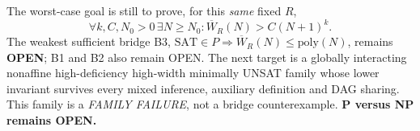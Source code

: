 \documentclass[11pt]{article}
\begin{document}
The worst-case goal is still to prove, for this \emph{same} fixed $R$,
\[
\forall k,C,N_0>0\,\exists N\ge N_0:\overline W_R(N)>C(N+1)^k.
\]
The weakest sufficient bridge B3, $\mathrm{SAT}\in P\Rightarrow\overline W_R(N)\le\mathrm{poly}(N)$, remains \textbf{OPEN}; B1 and B2 also remain OPEN. The next target is a globally interacting nonaffine high-deficiency high-width minimally UNSAT family whose lower invariant survives every mixed inference, auxiliary definition and DAG sharing. This family is a \emph{FAMILY FAILURE}, not a bridge counterexample. \textbf{P versus NP remains OPEN.}

\end{document}
